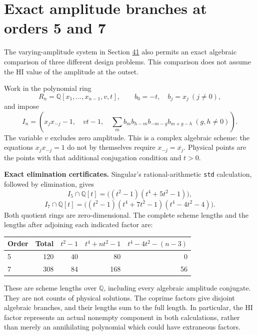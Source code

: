 \documentclass[11pt,reqno]{amsart}
\theoremstyle{plain}
\begin{document}
\section{Exact amplitude branches at orders 5 and 7}\label{sec:42}

The varying-amplitude system in Section \hyperref[sec:41]{41} also permits an exact algebraic
comparison of three different design problems. This comparison does not
assume the HI value of the amplitude at the outset.

Work in the polynomial ring
\[
 R_n=\mathbb Q[x_1,\ldots,x_{n-1},v,t],\qquad
 b_0=-t,\quad b_j=x_j\ (j\ne0),
\]
and impose
\begin{equation*}
 I_n=\left(x_jx_{-j}-1,\quad vt-1,\quad
 \sum_m b_m b_{h-m}b_{-m-g}b_{m+g-h}\ (g,h\ne0)\right).
 \tag{42.1}
\end{equation*}
The variable \(v\) excludes zero amplitude. This is a complex algebraic
scheme: the equations \(x_jx_{-j}=1\) do not by themselves require
\(x_{-j}=\overline{x_j}\). Physical points are the points with that
additional conjugation condition and \(t>0\).

\textbf{Exact elimination certificates.} Singular's rational-arithmetic
\texttt{std} calculation, followed by elimination, gives
\begin{equation*}
 \boxed{I_5\cap\mathbb Q[t]
 =\big((t^2-1)(t^4+5t^2-1)\big),} \tag{42.2}
\end{equation*}
\begin{equation*}
 \boxed{I_7\cap\mathbb Q[t]
 =\big((t^2-1)(t^4+7t^2-1)(t^4-4t^2-4)\big).} \tag{42.3}
\end{equation*}
Both quotient rings are zero-dimensional. The complete scheme lengths
and the lengths after adjoining each indicated factor are:

\begin{center}\small
\begin{tabular}{@{}lrrrr@{}}
\toprule
Order & Total & \(t^2-1\) & \(t^4+nt^2-1\) & \(t^4-4t^2-(n-3)\) \\
\midrule
5 & 120 & 40 & 80 & 0 \\
7 & 308 & 84 & 168 & 56 \\
\bottomrule
\end{tabular}
\end{center}

These are scheme lengths over \(\mathbb Q\), including every algebraic
amplitude conjugate. They are not counts of physical solutions. The
coprime factors give disjoint algebraic branches, and their lengths
sum to the full length. In particular, the HI factor represents an
actual nonempty component in both calculations, rather than merely
an annihilating polynomial which could have extraneous factors.
\end{document}
